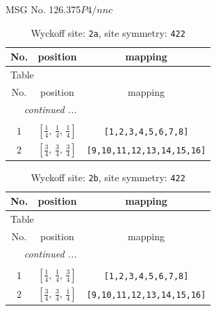 \documentclass[fleqn,8pt]{jsarticle}
\begin{document}
\setcounter{MaxMatrixCols}{32}

\renewcommand{\tablename}{Table~}
\renewcommand{\figurename}{Figure~}
\begin{center}
\LARGE
MSG No. 126.375\quad$P4/nnc$
\end{center}
\renewcommand{\arraystretch}{1.2}
\begin{longtable}{ccc}
\caption{Wyckoff site: {\tt 2a}, site symmetry: {\tt 422}}
 \\
 \hline \hline
No. & position & mapping \\ \hline \endfirsthead

\multicolumn{2}{l}{\tablename\ \thetable{}} \\
 \hline \hline
No. & position & mapping \\ \hline \endhead

 \hline \hline
\multicolumn{2}{r}{\footnotesize\it continued ...} \\ \endfoot

 \hline \hline
\multicolumn{2}{r}{} \\ \endlastfoot

1 & $\left[ \frac{1}{4},\, \frac{1}{4},\, \frac{1}{4} \right]$ & {\tt [1,2,3,4,5,6,7,8]} \\ \hline
2 & $\left[ \frac{3}{4},\, \frac{3}{4},\, \frac{3}{4} \right]$ & {\tt [9,10,11,12,13,14,15,16]} \\
\end{longtable}
\renewcommand{\arraystretch}{1.2}
\begin{longtable}{ccc}
\caption{Wyckoff site: {\tt 2b}, site symmetry: {\tt 422}}
 \\
 \hline \hline
No. & position & mapping \\ \hline \endfirsthead

\multicolumn{2}{l}{\tablename\ \thetable{}} \\
 \hline \hline
No. & position & mapping \\ \hline \endhead

 \hline \hline
\multicolumn{2}{r}{\footnotesize\it continued ...} \\ \endfoot

 \hline \hline
\multicolumn{2}{r}{} \\ \endlastfoot

1 & $\left[ \frac{1}{4},\, \frac{1}{4},\, \frac{3}{4} \right]$ & {\tt [1,2,3,4,5,6,7,8]} \\ \hline
2 & $\left[ \frac{3}{4},\, \frac{3}{4},\, \frac{1}{4} \right]$ & {\tt [9,10,11,12,13,14,15,16]} \\
\end{longtable}
\end{document}
